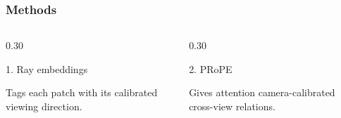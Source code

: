 \documentclass[aspectratio=169,11pt]{beamer}
\begin{document}
\begin{frame}
  \frametitle{Methods}

  \vspace{0.10cm}

  \begin{columns}[T,onlytextwidth]
    \begin{column}{0.30\textwidth}
      \begin{block}{1. Ray embeddings}
        \begin{center}
        \end{center}

        \vspace{0.08cm}
        {\scriptsize
        Tags each patch with its calibrated viewing direction.
        }
      \end{block}
    \end{column}

    \hfill

    \begin{column}{0.30\textwidth}
      \begin{block}{2. PRoPE}
        \begin{center}
        \end{center}

        \vspace{0.08cm}
        {\scriptsize
        Gives attention camera-calibrated cross-view relations.
        }
      \end{block}
    \end{column}


\end{columns}
\end{frame}
\end{document}
